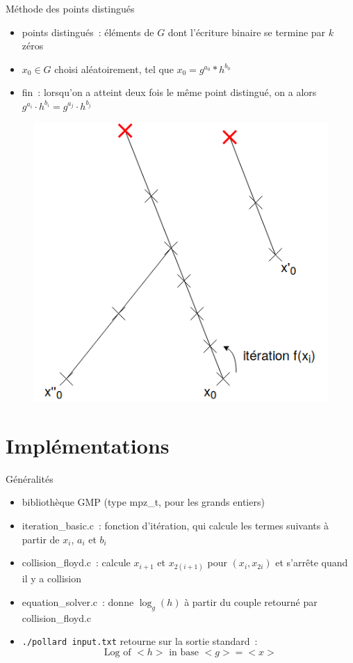 \documentclass{beamer}
\begin{document}
  \begin{frame}{Méthode des points distingués}
    \begin{itemize}
        \item points distingués~: éléments de $G$ dont l'écriture binaire se termine par $k$ zéros
        \item $x_0 \in G$ choisi aléatoirement, tel que $x_0 = g^{a_0} * h^{b_0}$
        \item fin~: lorsqu'on a atteint deux fois le même point distingué, on a alors $g^{a_i} \cdot h^{b_i} = g^{a_j} \cdot h^{b_j}$
    \end{itemize}
    \begin{figure}
      \center{}
      \includegraphics[scale=0.3]{images/lambda_distinguished_points.png}
      \caption{}
    \end{figure}
  \end{frame}


  \section{Implémentations}

  \begin{frame}{Généralités}
    \begin{itemize}
        \item bibliothèque GMP (type mpz\_t, pour les grands entiers)
        \item iteration\_basic.c~: fonction d'itération, qui calcule les termes suivants à partir de $x_i$, $a_i$ et $b_i$
        \item collision\_floyd.c~: calcule $x_{i+1}$ et $x_{2(i+1)}$ pour $(x_i,x_{2i})$ et s'arrête quand il y a collision
        \item equation\_solver.c~: donne $\log_g(h)$ à partir du couple retourné par collision\_floyd.c
        \item \texttt{./pollard input.txt} retourne sur la sortie standard~: 
        $$\text{\ Log of } <h> \text{\ in base } <g> = <x>$$
    \end{itemize}
  \end{frame}
\end{document}
